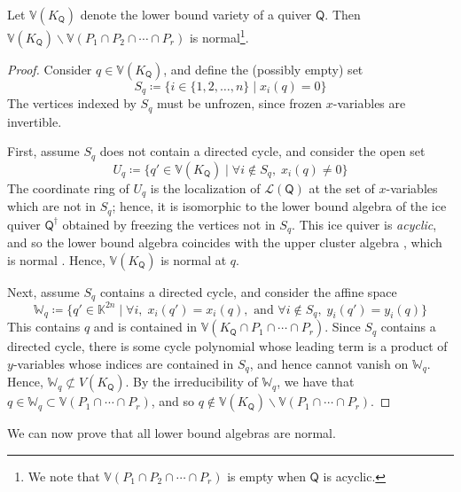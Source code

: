 \documentclass[ALCO,published]{cedram}
\numberwithin{equation}{section}
\renewcommand{\L}{\mathcal{L}}%
\newcommand{\1}{^{-1}}
\def\Q{\mathsf{Q}}
\begin{document}
\begin{prop}\label{prop:openSetIsNormal}
Let $\mathbb{V}(K_\Q)$ denote the lower bound variety of a quiver $\Q$.  Then $\mathbb{V}(K_\Q)\smallsetminus \mathbb{V}(P_1\cap P_2 \cap \cdots \cap P_r)$ is normal\footnote{We note that $\mathbb{V}(P_1\cap P_2\cap\cdots\cap P_r)$ is empty when $\Q$ is acyclic.}.
\end{prop}
\begin{proof}
Consider $q\in \mathbb{V}(K_\Q)$, and define the (possibly empty) set %
\[ S_q \coloneqq \{ i\in \{1,2,\dots,n \} \mid x_i(q) =0 \} \]
The vertices indexed by $S_q$ must be unfrozen, since frozen $x$-variables are invertible.

First, assume $S_q$ does not contain a directed cycle, and consider the open set
\[ U_q \coloneqq \{ q'\in \mathbb{V}(K_\Q) \mid \forall i\not\in S_q,\;x_i(q)\neq 0\} \]
The coordinate ring of $U_q$ is the localization of $\L(\Q)$ at the set of $x$-variables which are not in $S_q$; hence, it is isomorphic to the lower bound algebra of the ice quiver $\Q^\dagger$ obtained by freezing the vertices not in $S_q$.  This ice quiver is \emph{acyclic}, and so the lower bound algebra coincides with the upper cluster algebra \cite{BFZ05}, which is normal \cite{MulLA}.  Hence, $\mathbb{V}(K_\Q)$ is normal at $q$.

Next, assume $S_q$ contains a directed cycle, and consider the affine space 
\[ \mathbb{W}_q \coloneqq \{ q' \in \mathbb{K}^{2n} \mid \forall i, \;x_i(q')=x_i(q),\text{ and } \forall i \not\in S_q,\; y_i(q')=y_i(q)\} \]
This contains $q$ and is contained in $\mathbb{V}(K_\Q\cap P_1 \cap \cdots \cap P_r)$.  Since $S_q$ contains a directed cycle, there is some cycle polynomial whose leading term is a product of $y$-variables whose indices are contained in $S_q$, and hence cannot vanish on $\mathbb{W}_q$.  Hence, $\mathbb{W}_q\not\subset \mathbb{}V(K_\Q)$. By the irreducibility of $\mathbb{W}_q$, we have that $q\in\mathbb{W}_q\subset \mathbb{V}(P_1\cap \cdots\cap P_r)$, and so $q\not\in \mathbb{V}(K_\Q)\smallsetminus \mathbb{V}(P_1\cap \cdots \cap P_r)$.
\end{proof}


We can now prove that all lower bound algebras are normal.
\end{document}

